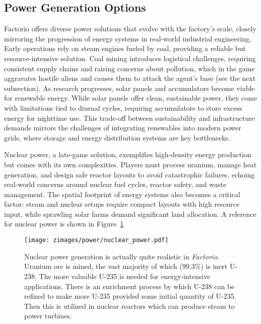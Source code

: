\subsection{Power Generation Options}
Factorio offers diverse power solutions that evolve with the factory’s scale, closely mirroring the progression of energy systems in real-world industrial engineering. Early operations rely on steam engines fueled by coal, providing a reliable but resource-intensive solution. Coal mining introduces logistical challenges, requiring consistent supply chains and raising concerns about pollution, which in the game aggravates hostile aliens and causes them to attack the agent's base (see the next subsection). As research progresses, solar panels and accumulators become viable for renewable energy. While solar panels offer clean, sustainable power, they come with limitations tied to diurnal cycles, requiring accumulators to store excess energy for nighttime use. This trade-off between sustainability and infrastructure demands mirrors the challenges of integrating renewables into modern power grids, where storage and energy distribution systems are key bottlenecks.

Nuclear power, a late-game solution, exemplifies high-density energy production but comes with its own complexities. Players must process uranium, manage heat generation, and design safe reactor layouts to avoid catastrophic failures, echoing real-world concerns around nuclear fuel cycles, reactor safety, and waste management. The spatial footprint of energy systems also becomes a critical factor: steam and nuclear setups require compact layouts with high resource input, while sprawling solar farms demand significant land allocation. A reference for nuclear power is shown in Figure~\ref{fig:nuclear_power}

\begin{figure}[ht]
    \centering
    \texttt{[image: zimages/power/nuclear\_power.pdf]}
    \caption{Nuclear power generation is actually quite realistic in \textit{Factorio}. Uranium ore is mined, the vast majority of which (99.3\%) is inert U-238. The more valuable U-235 is needed for energy-intensive applications. There is an enrichment process by which U-238 can be refined to make more U-235 provided some initial quantity of U-235. Then this is utilized in nuclear reactors which can produce steam to power turbines. \cite{nuclear}}
    \label{fig:nuclear_power}
\end{figure}


